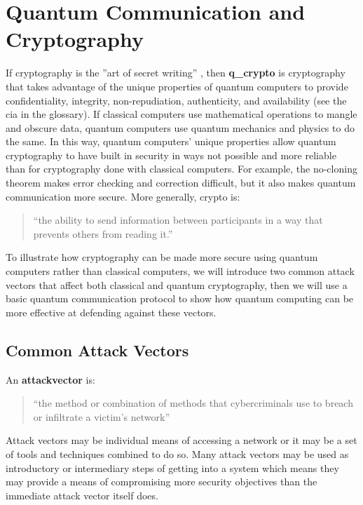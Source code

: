 \graphicspath{{Images/}}

\section{Quantum Communication and Cryptography} \label{q_crypto}
If cryptography is the ''art of secret writing'' \cite{netsec}, then \textbf{\gls{q_crypto}} is cryptography that takes advantage of the unique properties of quantum computers to provide \gls{confidentiality}, \gls{integrity}, \gls{non-repudiation}, \gls{authenticity}, and \gls{availability} (see the \gls{cia} in the glossary). If classical computers use mathematical operations to mangle and obscure data, quantum computers use quantum mechanics and physics to do the same. In this way, quantum computers' unique properties allow quantum cryptography to have built in security in ways not possible and more reliable than for cryptography done with classical computers. For example, the no-cloning theorem makes error checking and correction difficult, but it also makes quantum communication more secure.  More generally, \gls{crypto} is:

\begin{quote}
    ``the ability to send information between participants in a way that prevents others from reading it.'' \cite{netsec}
\end{quote}

 To illustrate how cryptography can be made more secure using quantum computers rather than classical computers, we will introduce two common attack vectors that affect both classical and quantum cryptography, then we will use a basic quantum communication protocol to show how quantum computing can be more effective at defending against these vectors.

    \subsection{Common Attack Vectors}
    An \textbf{\gls{attackvector}} is:
    \begin{quote}
        ``the method or combination of methods that cybercriminals use to breach or infiltrate a victim's network'' \cite{attackvectors}
    \end{quote}
    Attack vectors may be individual means of accessing a network or it may be a set of tools and techniques combined to do so. Many attack vectors may be used as introductory or intermediary steps of getting into a system which means they may provide a means of compromising more security objectives than the immediate attack vector itself does.  
    
